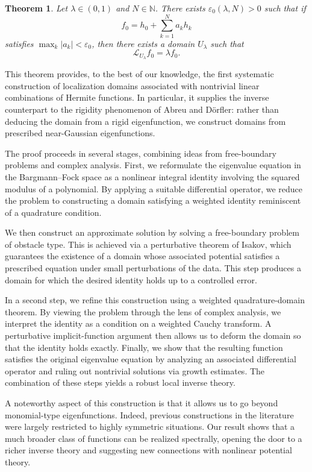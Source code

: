 \documentclass[a4paper,11pt,reqno]{amsart}
\numberwithin{equation}{section}
\theoremstyle{plain} %
\newtheorem{theorem}{Theorem}
\theoremstyle{definition} %
\theoremstyle{remark}
\begin{document}
\begin{theorem}\label{thm:perturb}
Let $\lambda\in (0,1)$ and $N\in\mathbb N$. There exists $\varepsilon_0(\lambda,N)>0$ such that if
\[
f_0 = h_0 + \sum_{k=1}^N a_k h_k
\]
satisfies $\max_k |a_k|<\varepsilon_0$, then there exists a domain $U_\lambda$ such that
\[
\mathcal L_{U_\lambda} f_0 = \lambda f_0 .
\]
\end{theorem}

This theorem provides, to the best of our knowledge, the first systematic construction of localization domains associated with nontrivial linear combinations of Hermite functions. In particular, it supplies the inverse counterpart to the rigidity phenomenon of Abreu and D\"orfler: rather than deducing the domain from a rigid eigenfunction, we construct domains from prescribed near-Gaussian eigenfunctions.

The proof proceeds in several stages, combining ideas from free-boundary problems and complex analysis. First, we reformulate the eigenvalue equation in the Bargmann--Fock space as a nonlinear integral identity involving the squared modulus of a polynomial. By applying a suitable differential operator, we reduce the problem to constructing a domain satisfying a weighted identity reminiscent of a quadrature condition.

We then construct an approximate solution by solving a free-boundary problem of obstacle type. This is achieved via a perturbative theorem of Isakov, which guarantees the existence of a domain whose associated potential satisfies a prescribed equation under small perturbations of the data. This step produces a domain for which the desired identity holds up to a controlled error.

In a second step, we refine this construction using a weighted quadrature-domain theorem. By viewing the problem through the lens of complex analysis, we interpret the identity as a condition on a weighted Cauchy transform. A perturbative implicit-function argument then allows us to deform the domain so that the identity holds exactly. Finally, we show that the resulting function satisfies the original eigenvalue equation by analyzing an associated differential operator and ruling out nontrivial solutions via growth estimates. The combination of these steps yields a robust local inverse theory.

\medskip

A noteworthy aspect of this construction is that it allows us to go beyond monomial-type eigenfunctions. Indeed, previous constructions in the literature were largely restricted to highly symmetric situations. Our result shows that a much broader class of functions can be realized spectrally, opening the door to a richer inverse theory and suggesting new connections with nonlinear potential theory.
\end{document}
